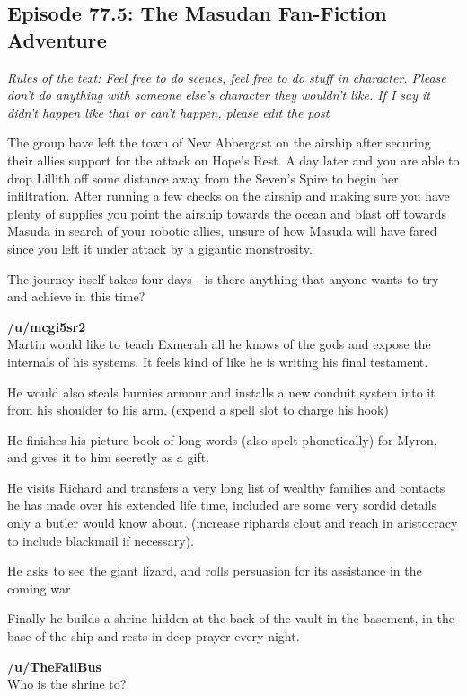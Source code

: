 \subsection{Episode 77.5: The Masudan Fan-Fiction Adventure}

\textit{Rules of the text: Feel free to do scenes, feel free to do stuff in character. Please don't do anything with someone else's character they wouldn't like. If I say it didn't happen like that or can't happen, please edit the post}\medskip

The group have left the town of New Abbergast on the airship after securing their allies support for the attack on Hope's Rest. A day later and you are able to drop Lillith off some distance away from the Seven's Spire to begin her infiltration. After running a few checks on the airship and making sure you have plenty of supplies you point the airship towards the ocean and blast off towards Masuda in search of your robotic allies, unsure of how Masuda will have fared since you left it under attack by a gigantic monstrosity.\medskip

The journey itself takes four days - is there anything that anyone wants to try and achieve in this time?\medskip

\textbf{/u/mcgi5sr2}\\
Martin would like to teach Exmerah all he knows of the gods and expose the internals of his systems. It feels kind of like he is writing his final testament.\medskip

He would also steals burnies armour and installs a new conduit system into it from his shoulder to his arm. (expend a spell slot to charge his hook)\medskip

He finishes his picture book of long words (also spelt phonetically) for Myron, and gives it to him secretly as a gift.\medskip

He visits Richard and transfers a very long list of wealthy families and contacts he has made over his extended life time, included are some very sordid details only a butler would know about. (increase riphards clout and reach in aristocracy to include blackmail if necessary).\medskip

He asks to see the giant lizard, and rolls persuasion for its assistance in the coming war\medskip

Finally he builds a shrine hidden at the back of the vault in the basement, in the base of the ship and rests in deep prayer every night.\medskip

\textbf{/u/TheFailBus}\\
Who is the shrine to?\medskip

